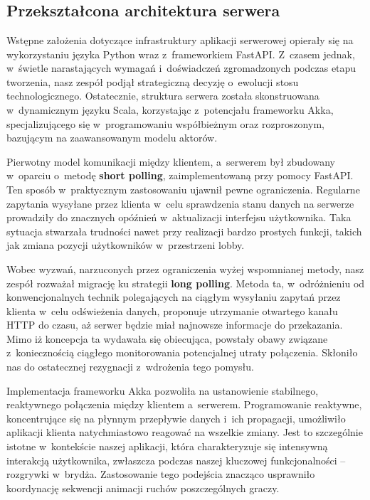 \chapter{\ChapterTitleRealizationAspects}
\label{sec:wybrane-aspekty-realizacji}

\section{Przekształcona architektura serwera}

Wstępne założenia dotyczące infrastruktury aplikacji
serwerowej opierały się na wykorzystaniu języka Python
wraz z~frameworkiem FastAPI. Z~czasem jednak, w~świetle
narastających wymagań i~doświadczeń zgromadzonych
podczas etapu tworzenia, nasz zespół podjął
strategiczną decyzję o~ewolucji stosu technologicznego.
Ostatecznie, struktura serwera została skonstruowana
w~dynamicznym języku Scala, korzystając z~potencjału
frameworku Akka, specjalizującego się w~programowaniu
współbieżnym oraz rozproszonym, bazującym na
zaawansowanym modelu aktorów.

Pierwotny model komunikacji między klientem, a~serwerem
był zbudowany w~oparciu o~metodę \textbf{short polling},
zaimplementowaną przy pomocy FastAPI. Ten sposób
w~praktycznym zastosowaniu ujawnił pewne ograniczenia.
Regularne zapytania wysyłane przez klienta w~celu
sprawdzenia stanu danych na serwerze prowadziły do
znacznych opóźnień w~aktualizacji interfejsu
użytkownika. Taka sytuacja stwarzała trudności nawet
przy realizacji bardzo prostych funkcji, takich jak
zmiana pozycji użytkowników w~przestrzeni lobby.

Wobec wyzwań, narzuconych przez ograniczenia wyżej wspomnianej metody, nasz
zespół rozważał migrację ku strategii \textbf{long polling}. Metoda ta,
w~odróżnieniu od konwencjonalnych technik polegających na ciągłym
wysyłaniu zapytań przez klienta w~celu odświeżenia danych, proponuje
utrzymanie otwartego kanału HTTP do czasu, aż serwer będzie miał
najnowsze informacje do przekazania. Mimo iż koncepcja ta wydawała się
obiecująca, powstały obawy związane z~koniecznością ciągłego monitorowania
potencjalnej utraty połączenia. Skłoniło nas do ostatecznej rezygnacji
z~wdrożenia tego pomysłu.

Implementacja frameworku Akka pozwoliła na ustanowienie stabilnego,
reaktywnego połączenia między klientem a~serwerem. Programowanie reaktywne,
koncentrujące się na płynnym przepływie danych i~ich propagacji, umożliwiło
aplikacji klienta natychmiastowo reagować na wszelkie zmiany. Jest to
szczególnie istotne w~kontekście naszej aplikacji, która charakteryzuje
się intensywną interakcją użytkownika, zwłaszcza podczas naszej kluczowej
funkcjonalności -- rozgrywki w~brydża. Zastosowanie tego podejścia
znacząco usprawniło koordynację sekwencji animacji ruchów poszczególnych
graczy.

